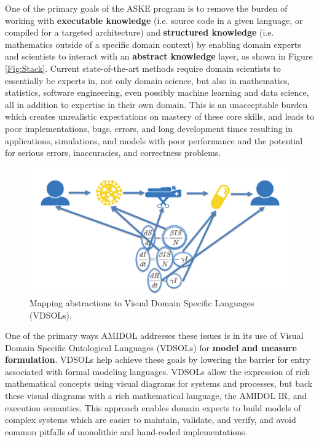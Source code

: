 \documentclass[12pt]{galois-whitepaper}
\begin{document}
  One of the primary goals of the ASKE program is to remove the burden
  of working with \textbf{executable knowledge} (i.e. source code in a
  given language, or compiled for a targeted architecture) and
  \textbf{structured knowledge} (i.e. mathematics outside of a
  specific domain context) by enabling domain experts and scientists
  to interact with an \textbf{abstract knowledge} layer, as shown in
  Figure \ref{Fig:Stack}.  Current state-of-the-art methods require
  domain scientists to essentially be experts in, not only domain
  science, but also in mathematics, statistics, software engineering,
  even possibly machine learning and data science, all in addition to
  expertise in their own domain.  This is an unacceptable burden which
  creates unrealistic expectations on mastery of these core skills,
  and leads to poor implementations, bugs, errors, and long
  development times resulting in applications, simulations, and models
  with poor performance and the potential for serious errors,
  inaccuracies, and correctness problems.
  
  \begin{figure}
    \centering
    \includegraphics[width=\textwidth]{high-level-abstraction.png}
    \caption{Mapping abstractions to Visual Domain Specific Languages (VDSOLs).}
    \label{Fig:Abstraction}
  \end{figure}

  One of the primary ways AMIDOL addresses these issues is in its use
  of Visual Domain Specific Ontological Languages (VDSOLs) for
  \textbf{model and measure formulation}.  VDSOLs help achieve these
  goals by lowering the barrier for entry associated with formal
  modeling languages. VDSOLs allow the expression of rich mathematical
  concepts using visual diagrams for systems and processes, but back
  these visual diagrams with a rich mathematical language, the AMIDOL
  IR, and execution semantics.  This approach enables domain experts
  to build models of complex systems which are easier to maintain,
  validate, and verify, and avoid common pitfalls of monolithic and
  hand-coded implementations.
\end{document}
